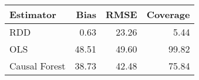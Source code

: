 \begin{table}[ht]
\centering
\begin{tabular}{lrrr}
  \hline
Estimator & Bias & RMSE & Coverage \\ 
  \hline
RDD & 0.63 & 23.26 & 5.44 \\ 
  OLS & 48.51 & 49.60 & 99.82 \\ 
  Causal Forest & 38.73 & 42.48 & 75.84 \\ 
   \hline
\end{tabular}
\end{table}
